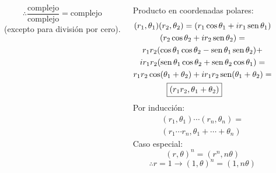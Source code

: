 \documentclass[9pt, aspectratio=169]{beamer}
\begin{document}
\begin{frame}
\begin{columns}[t]
  \[ \therefore \frac{\text{complejo}}{\text{complejo}} = \text{complejo} \]
  (excepto para división por cero).

  Producto en coordenadas polares:
  \begin{multline*}
   (r_1, \theta_1)(r_2, \theta_2) = (r_1 \cos \theta_1 + i r_1 \operatorname{sen} \theta_1) \\
   (r_2 \cos \theta_2 + i r_2 \operatorname{sen} \theta_2)= \\
   r_1 r_2 (\cos \theta_1 \cos \theta_2 - \operatorname{sen} \theta_1 \operatorname{sen} \theta_2) + \\
   i r_1 r_2 (\operatorname{sen} \theta_1 \cos \theta_2 + \operatorname{sen} \theta_2 \cos \theta_1) = \\
   r_1 r_2 \cos(\theta_1 + \theta_2) + i r_1 r_2 \operatorname{sen}(\theta_1 + \theta_2) = \\
   \boxed{ (r_1 r_2, \theta_1 + \theta_2) } \qquad
  \end{multline*}
  Por inducción:
  \begin{multline*}
   (r_1, \theta_1) \cdots (r_n, \theta_n) = \\
   (r_1 \cdots r_n, \theta_1 + \cdots + \theta_n)
  \end{multline*}
  Caso especial:
  \[ (r, \theta)^n = (r^n, n \theta) \]
   \[ \therefore r = 1 \rightarrow (1, \theta)^n = (1, n \theta) \]
 \end{columns}
\end{frame}
\end{document}
